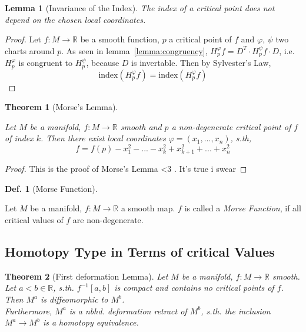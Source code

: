 \documentclass{article}
\theoremstyle{plain}
\newtheorem{theorem}{Theorem}[subsection]
\theoremstyle{plain}
\theoremstyle{plain}
\newtheorem{lemma}{Lemma}[subsection]
\theoremstyle{definition}
\newtheorem{definition}{Def.}[subsection]
\theoremstyle{remark}
\begin{document}
\begin{lemma}[Invariance of the Index]
   \label{lemma:index}
   The index of a critical point does not depend on the chosen local coordinates.
\end{lemma}

\begin{proof}
   Let $f: M \rightarrow \mathbb{R}$ be a smooth function, $p$ a critical point of $f$
   and $\varphi$, $\psi$ two charts around $p$.
   As seen in lemma~\ref{lemma:congruency}, $H_p^{\varphi}f = D^T \cdot H_p^{\psi}f \cdot D$, i.e.
   $H_p^{\varphi}$ is congruent to $H_p^{\psi}$, because $D$ is invertable. Then by Sylvester's Law, 
   \[ \text{{index}}(H_p^{\varphi}f) = \text{{index}}(H_p^{\varphi}f) \]
\end{proof}

\begin{theorem}[Morse's Lemma]
   \label{theorem:morse lemma}

   Let $M$ be a manifold, $f: M \rightarrow \mathbb{R}$ smooth and $p$ a non-degenerate 
   critical point of $f$ of index $k$. Then there exist local coordinates $\varphi = (x_1, ..., x_n)$, s.th,
   \[ f = f(p) - x_1^2 - ... - x_k^2 + x_{k+1}^2 + ... + x_n^2 \]
\end{theorem}

\begin{proof}
   This is the proof of Morse's Lemma <3 . It's true i swear
\end{proof}

\begin{definition}[Morse Function]
   \label{def:morse function}

   Let $M$ be a manifold, $f:M \rightarrow \mathbb{R}$ a smooth map. $f$ is called a \textit{Morse Function},
   if all critical values of $f$ are non-degenerate.   
\end{definition}

\subsection{Homotopy Type in Terms of critical Values}

\begin{theorem}[First deformation Lemma]
   \label{theorem:1st deformation lemma}
   Let $M$ be a manifold, $f: M \rightarrow \mathbb{R}$ smooth. Let $a < b \in \mathbb{R}$, s.th. 
   $f^{-1}[a, b]$ is compact and contains no critical points of $f$. Then $M^a$ is diffeomorphic
   to $M^b$. \\ 
   Furthermore, $M^a$ is a nbhd. deformation retract of $M^b$, s.th. the inclusion
   $M^a \rightarrow M^b$ is a homotopy equivalence.
\end{theorem}
\end{document}
